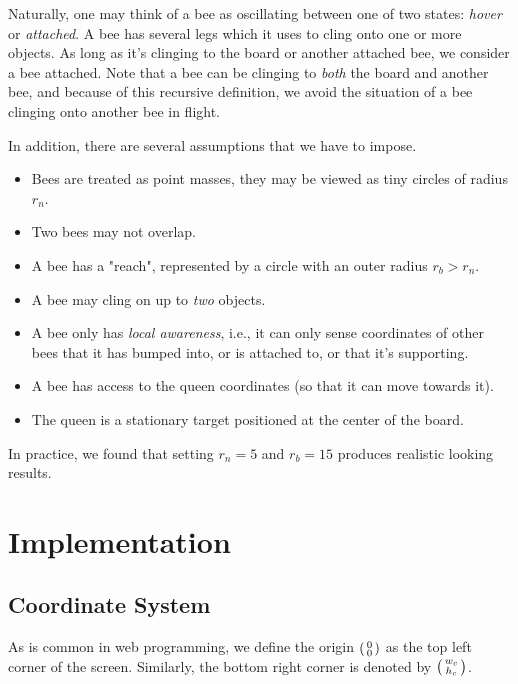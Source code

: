 \documentclass[a4paper,10pt]{article}
\begin{document}
\begin{multicols}{2}
    Naturally, one may think of a bee as oscillating between one of two states: \textit{hover} or \textit{attached}.
    A bee has several legs which it uses to cling onto one or more objects. As long as it's clinging
    to the board or another attached bee, we consider a bee attached. Note that a bee can be clinging
    to \textit{both} the board and another bee, and because of this recursive definition, we avoid
    the situation of a bee clinging onto another bee in flight.

    In addition, there are several assumptions that we have to impose.

    \begin{itemize}
        \item Bees are treated as point masses, they may be viewed as tiny circles of radius $r_{n}$.
        \item Two bees may not overlap.
        \item A bee has a "reach", represented by a circle with an outer radius $r_{b} > r_{n}$.
        \item A bee may cling on up to \textit{two} objects.
        \item A bee only has \textit{local awareness}, i.e., it can only sense coordinates
        of other bees that it has bumped into, or is attached to, or that it's supporting.
        \item A bee has access to the queen coordinates (so that it can move towards it).
        \item The queen is a stationary target positioned at the center of the board.
    \end{itemize}

    In practice, we found that setting $r_{n} = 5$ and $r_{b} = 15$ produces realistic
    looking results.

    \section{Implementation}

    \subsection{Coordinate System}
    As is common in web programming, we define the origin $\begin{psmallmatrix} 0 \\ 0 \end{psmallmatrix}$
    as the top left corner of the screen. Similarly, the bottom right corner is denoted by
    $\begin{psmallmatrix} w_{c} \\ h_{c} \end{psmallmatrix}$.


\end{multicols}
\end{document}
